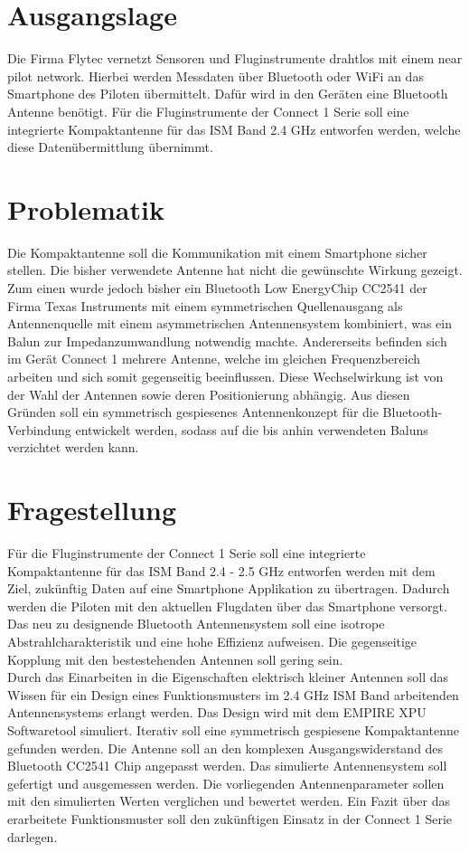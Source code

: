 \section{Ausgangslage}
Die Firma Flytec vernetzt Sensoren und Fluginstrumente drahtlos mit einem  \glqq near pilot network\grqq. Hierbei werden Messdaten über Bluetooth oder WiFi an das Smartphone des Piloten übermittelt. Dafür wird in den Geräten eine Bluetooth Antenne benötigt. Für die Fluginstrumente der \glqq Connect 1 \grqq Serie  soll eine integrierte Kompaktantenne für das ISM Band 2.4 GHz entworfen werden, welche diese Datenübermittlung übernimmt. 

\section{Problematik}
Die Kompaktantenne soll die Kommunikation mit einem Smartphone sicher stellen. Die bisher verwendete Antenne hat nicht die gewünschte Wirkung gezeigt. Zum einen wurde jedoch bisher ein \glqq Bluetooth Low Energy\grqq Chip CC2541 der Firma Texas Instruments mit einem symmetrischen Quellenausgang als Antennenquelle mit einem asymmetrischen  Antennensystem kombiniert, was  ein Balun zur Impedanzumwandlung notwendig machte. Andererseits befinden sich im Gerät \glqq Connect 1 \grqq mehrere Antenne, welche im gleichen Frequenzbereich arbeiten und sich somit gegenseitig beeinflussen. Diese Wechselwirkung ist von der Wahl der Antennen sowie deren Positionierung abhängig. Aus diesen Gründen soll ein symmetrisch gespiesenes Antennenkonzept für die Bluetooth-Verbindung entwickelt werden, sodass auf die bis anhin verwendeten Baluns verzichtet werden kann.
\section{Fragestellung}
Für die Fluginstrumente der \glqq Connect 1 \grqq Serie  soll eine integrierte Kompaktantenne für das ISM Band 2.4 - 2.5 GHz entworfen werden mit dem Ziel, zukünftig Daten auf eine Smartphone Applikation zu übertragen. Dadurch werden die Piloten mit den aktuellen Flugdaten über das Smartphone  versorgt. Das neu zu designende Bluetooth Antennensystem soll eine isotrope Abstrahlcharakteristik und eine
 hohe Effizienz aufweisen. Die gegenseitige Kopplung mit den bestestehenden Antennen soll gering sein. \\


Durch das Einarbeiten in die Eigenschaften elektrisch kleiner Antennen soll das Wissen für ein Design eines Funktionsmusters  im 2.4 GHz ISM Band arbeitenden Antennensystems erlangt werden. Das Design wird mit dem EMPIRE XPU Softwaretool simuliert. Iterativ soll eine symmetrisch gespiesene Kompaktantenne gefunden werden. Die Antenne soll an den komplexen Ausgangswiderstand des Bluetooth CC2541 Chip angepasst werden. Das simulierte Antennensystem soll gefertigt und ausgemessen werden. Die vorliegenden Antennenparameter sollen mit den simulierten Werten verglichen und bewertet werden. Ein Fazit über das erarbeitete Funktionsmuster soll den zukünftigen Einsatz in der \glqq Connect 1 \grqq Serie darlegen.
